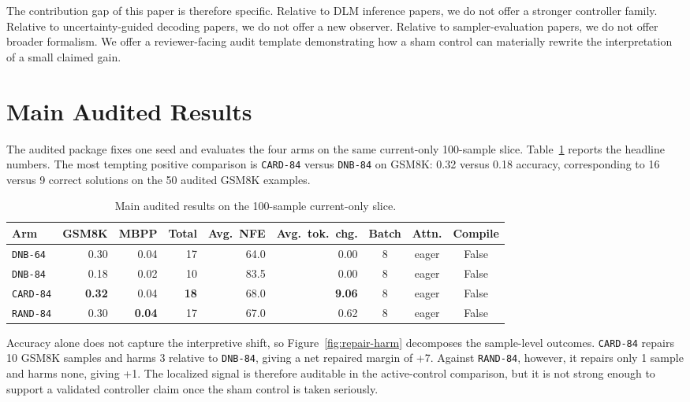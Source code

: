 \documentclass{article}
\begin{document}
The contribution gap of this paper is therefore specific. Relative to DLM inference papers, we do not offer a stronger controller family. Relative to uncertainty-guided decoding papers, we do not offer a new observer. Relative to sampler-evaluation papers, we do not offer broader formalism. We offer a reviewer-facing audit template demonstrating how a sham control can materially rewrite the interpretation of a small claimed gain.

\section{Main Audited Results}
\label{sec:results}

The audited package fixes one seed and evaluates the four arms on the same current-only 100-sample slice. Table~\ref{tab:main-results} reports the headline numbers. The most tempting positive comparison is \texttt{CARD-84} versus \texttt{DNB-84} on GSM8K: 0.32 versus 0.18 accuracy, corresponding to 16 versus 9 correct solutions on the 50 audited GSM8K examples.

\begin{table}[t]
\centering
\caption{Main audited results on the 100-sample current-only slice.}
\label{tab:main-results}
\begin{tabular}{lrrrrrccc}
\toprule
Arm & GSM8K & MBPP & Total & Avg.\ NFE & Avg.\ tok.\ chg. & Batch & Attn. & Compile \\
\midrule
\texttt{DNB-64} & 0.30 & 0.04 & 17 & 64.0 & 0.00 & 8 & eager & False \\
\texttt{DNB-84} & 0.18 & 0.02 & 10 & 83.5 & 0.00 & 8 & eager & False \\
\texttt{CARD-84} & \textbf{0.32} & 0.04 & \textbf{18} & 68.0 & \textbf{9.06} & 8 & eager & False \\
\texttt{RAND-84} & 0.30 & \textbf{0.04} & 17 & 67.0 & 0.62 & 8 & eager & False \\
\bottomrule
\end{tabular}
\end{table}

Accuracy alone does not capture the interpretive shift, so Figure~\ref{fig:repair-harm} decomposes the sample-level outcomes. \texttt{CARD-84} repairs 10 GSM8K samples and harms 3 relative to \texttt{DNB-84}, giving a net repaired margin of +7. Against \texttt{RAND-84}, however, it repairs only 1 sample and harms none, giving +1. The localized signal is therefore auditable in the active-control comparison, but it is not strong enough to support a validated controller claim once the sham control is taken seriously.
\end{document}
